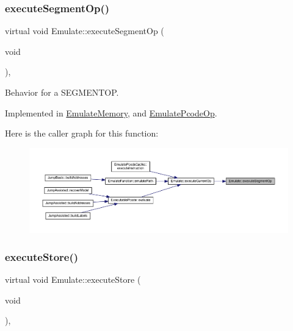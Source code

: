 \subsubsection{\texorpdfstring{executeSegmentOp()}{executeSegmentOp()}}
{\footnotesize\ttfamily virtual void Emulate\+::execute\+Segment\+Op (\begin{DoxyParamCaption}\item[{void}]{ }\end{DoxyParamCaption})\hspace{0.3cm}{\ttfamily [protected]}, {}}



Behavior for a S\+E\+G\+M\+E\+N\+T\+OP. 



Implemented in \mbox{\hyperlink{class_emulate_memory_adeaca111cdc5c93df51a020b74528886}{Emulate\+Memory}}, and \mbox{\hyperlink{class_emulate_pcode_op_a4335b878ca40061dcde8f45fabb82e16}{Emulate\+Pcode\+Op}}.

Here is the caller graph for this function\+:
\nopagebreak
\begin{figure}[H]
\begin{center}
\leavevmode
\includegraphics[width=350pt]{class_emulate_ac4c13159c340cd33ca6f3b69d2b50e38_icgraph}
\end{center}
\end{figure}
\mbox{\label{class_emulate_a634f0261bf49be73e7d31a2baf9f6e4d}} 
\subsubsection{\texorpdfstring{executeStore()}{executeStore()}}
{\footnotesize\ttfamily virtual void Emulate\+::execute\+Store (\begin{DoxyParamCaption}\item[{void}]{ }\end{DoxyParamCaption})\hspace{0.3cm}{\ttfamily [protected]}, {}}



